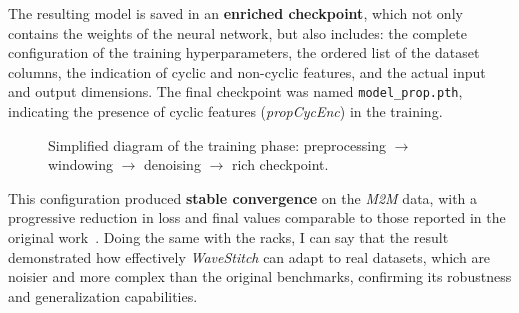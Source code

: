 The resulting model is saved in an \textbf{enriched checkpoint}, which not only contains the weights of the neural network, but also includes: the complete configuration of the training hyperparameters, the ordered list of the dataset columns, the indication of cyclic and non-cyclic features, and the actual input and output dimensions.  
The final checkpoint was named \texttt{model\_prop.pth}, indicating the presence of cyclic features (\emph{propCycEnc}) in the training.

\begin{figure}[H]
\centering
{}
\caption{Simplified diagram of the training phase: preprocessing $\rightarrow$ windowing $\rightarrow$ denoising $\rightarrow$ rich checkpoint.}
\label{fig:training_pipeline}
\end{figure}

This configuration produced \textbf{stable convergence} on the \emph{M2M} data, with a progressive reduction in loss and final values comparable to those reported in the original work~\cite{wavestitch,ho2020ddpm,dhariwal2021improved}.  
Doing the same with the racks, I can say that the result demonstrated how effectively \emph{WaveStitch} can adapt to real datasets, which are noisier and more complex than the original benchmarks, confirming its robustness and generalization capabilities.


